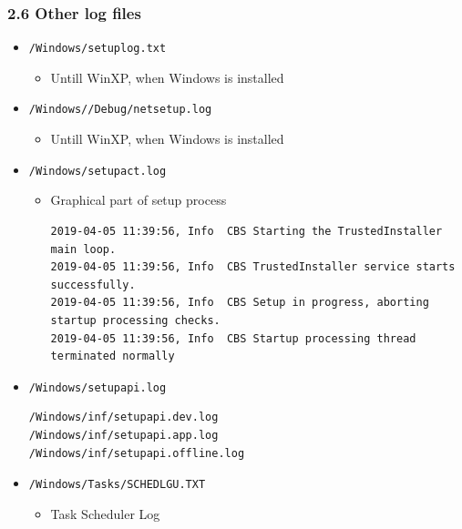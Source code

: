 \begin{frame}[fragile]
  \frametitle{2.6 Other log files}
    \begin{itemize}
	\item \texttt{/Windows/setuplog.txt}
        \begin{itemize}
            \item Untill WinXP, when Windows is installed
        \end{itemize}
	\item \texttt{/Windows//Debug/netsetup.log}
        \begin{itemize}
            \item Untill WinXP, when Windows is installed
        \end{itemize}
	\item \texttt{/Windows/setupact.log}
        \begin{itemize}
            \item Graphical part of setup process
  \begin{lstlisting}[basicstyle=\tiny]
2019-04-05 11:39:56, Info  CBS Starting the TrustedInstaller main loop.
2019-04-05 11:39:56, Info  CBS TrustedInstaller service starts successfully.
2019-04-05 11:39:56, Info  CBS Setup in progress, aborting startup processing checks.
2019-04-05 11:39:56, Info  CBS Startup processing thread terminated normally
    \end{lstlisting}
	\end{itemize}
	\item \texttt{/Windows/setupapi.log}
  \begin{lstlisting}[basicstyle=\tiny]
/Windows/inf/setupapi.dev.log
/Windows/inf/setupapi.app.log
/Windows/inf/setupapi.offline.log
    \end{lstlisting}
	\item \texttt{/Windows/Tasks/SCHEDLGU.TXT}
        \begin{itemize}
            \item Task Scheduler Log
	\end{itemize}
    \end{itemize}
\end{frame}


